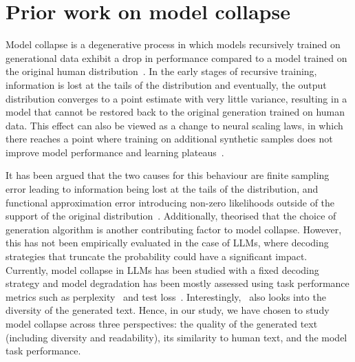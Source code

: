 \section{Prior work on model collapse}
\label{sec:model_collapse}
%
Model collapse is a degenerative process in which models recursively trained on generational data exhibit a drop in performance compared to a model trained on the original human distribution~\cite{shumailov2023curse}. In the early stages of recursive training, information is lost at the tails of the distribution and eventually, the output distribution converges to a point estimate with very little variance, resulting in a model that cannot be restored back to the original generation trained on human data. This effect can also be viewed as a change to neural scaling laws, in which there reaches a point where training on additional synthetic samples does not improve model performance and learning plateaus~\cite{dohmatob2024tale}.

It has been argued that the two causes for this behaviour are finite sampling error leading to information being lost at the tails of the distribution, and functional approximation error introducing non-zero likelihoods outside of the support of the original distribution~\cite{shumailov2023curse}. Additionally, \citet{dohmatob2024tale} theorised that the choice of generation algorithm is another contributing factor to model collapse. However, this has not been empirically evaluated in the case of LLMs, where decoding strategies that truncate the probability could have a significant impact. Currently, model collapse in LLMs has been studied with a fixed decoding strategy and model degradation has been mostly assessed using task performance metrics such as perplexity~\cite{shumailov2024ai} and test loss~\cite{gerstgrasser_is_2024}. Interestingly,~\citet{guo-etal2024-curious} also looks into the diversity of the generated text. Hence, in our study, we have chosen to study model collapse across three perspectives: the quality of the generated text (including diversity and readability), its similarity to human text, and the model task performance.

